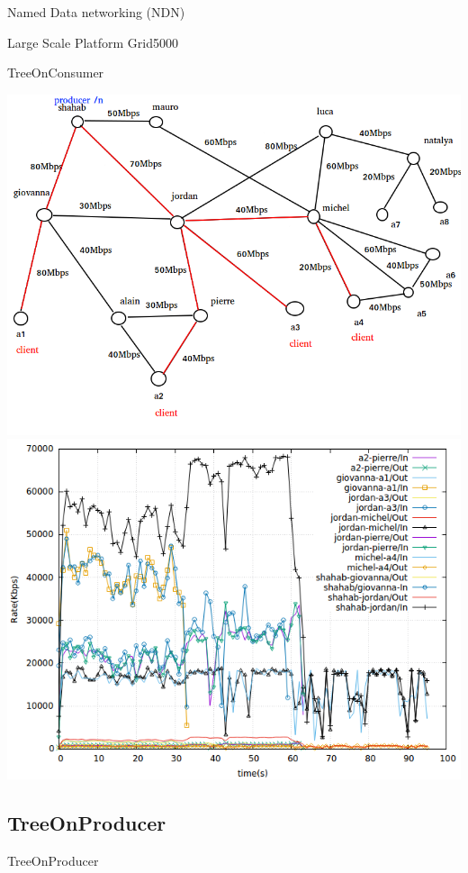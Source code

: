 \documentclass[8pt]{beamer}
\newcommand{\1}{\mathbbm 1}
\begin{document}
\begin{frame}{Named Data networking (NDN)}
\begin{frame}{Large Scale Platform Grid5000}
\begin{frame}{TreeOnConsumer}
{\includegraphics[scale=0.22]{figures/TreeOnConsumer_big.png} 
\includegraphics[scale=0.23]{figures/treeonconsumer_big.png} 

}

\end{frame}

\subsection{TreeOnProducer}

\begin{frame}{TreeOnProducer}
\end{frame}
\end{frame}
\end{frame}
\end{document}
